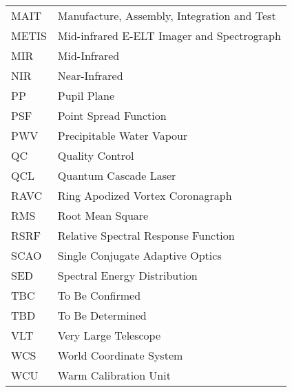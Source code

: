 \begin{longtable}{p{2cm}p{14cm}}
  MAIT    & Manufacture, Assembly, Integration and Test \\
  METIS   & Mid-infrared E-ELT Imager and Spectrograph \\
  MIR     & Mid-Infrared                               \\
  NIR     & Near-Infrared                              \\
  PP      & Pupil Plane                                \\
  PSF     & Point Spread Function                      \\
  PWV     & Precipitable Water Vapour                  \\
  QC      & Quality Control                            \\
  QCL     & Quantum Cascade Laser                      \\
  RAVC    & Ring Apodized Vortex Coronagraph           \\
  RMS     & Root Mean Square                           \\
  RSRF    & Relative Spectral Response Function        \\
  SCAO    & Single Conjugate Adaptive Optics           \\
  SED     & Spectral Energy Distribution               \\
  TBC     & To Be Confirmed                            \\
  TBD     & To Be Determined                           \\
  VLT     & Very Large Telescope                       \\
  WCS     & World Coordinate System                    \\
  WCU     & Warm Calibration Unit                      \\
\end{longtable}


